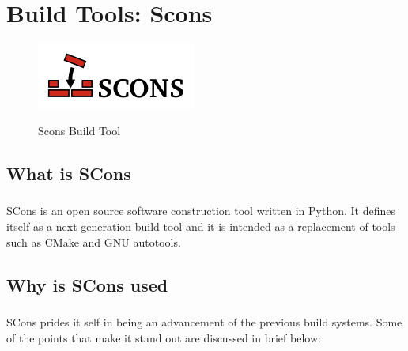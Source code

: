 \documentclass[a4paper,11pt]{report}
\begin{document}
\chapter {Build Tools: Scons}

\begin{figure}[h]
	\centering
		\includegraphics{images/scons-logo-transparent.png}~\\[1cm]
		\caption{Scons Build Tool}
\end{figure}

\section{What is SCons}

\paragraph{}

SCons is an open source software construction tool written in Python. It defines itself as a next-generation build tool and it is intended as a replacement of tools such as CMake and GNU autotools. 

\section{Why is SCons used}

\paragraph{}

SCons prides it self in being an advancement of the previous build systems. Some of the points that make it stand out are discussed in brief below:
\end{document}
